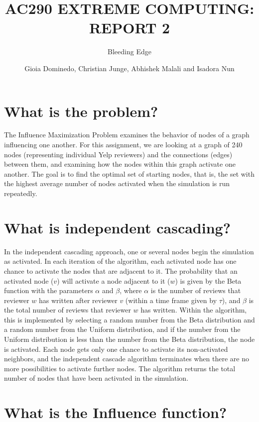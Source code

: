 \documentclass[11pt]{scrartcl} %
\title{AC290 EXTREME COMPUTING: REPORT 2}
\subtitle{Bleeding Edge}
\author{Gioia Dominedo, Christian Junge, Abhishek Malali and Isadora Nun}
\begin{document}
\maketitle

\section{What is the problem?}

The Influence Maximization Problem examines the behavior of nodes of a graph influencing one another.  For this assignment, we are looking at a graph of 240 nodes (representing individual Yelp reviewers) and the connections (edges) between them, and examining how the nodes within this graph activate one another.  The goal is to find the optimal set of starting nodes, that is, the set with the highest average number of nodes activated when the simulation is run repeatedly.  

\section{What is independent cascading?}

In the independent cascading approach, one or several nodes begin the simulation as activated.  In each iteration of the algorithm, each activated node has one chance to activate the nodes that are adjacent to it.  The probability that an activated node ($v$) will activate a node adjacent to it ($w$) is given by the Beta function with the parameters $\alpha$ and $\beta$, where $\alpha$ is the number of reviews that reviewer $w$ has written after reviewer $v$ (within a time frame given by $\tau$), and $\beta$ is the total number of reviews that reviewer $w$ has written.  Within the algorithm, this is implemented by selecting a random number from the Beta distribution and a random number from the Uniform distribution, and if the number from the Uniform distribution is less than the number from the Beta distribution, the node is activated.  Each node gets only one chance to activate its non-activated neighbors, and the independent cascade algorithm terminates when there are no more possibilities to activate further nodes.  The algorithm returns the total number of nodes that have been activated in the simulation.  

\section{What is the Influence function?}
\end{document}
